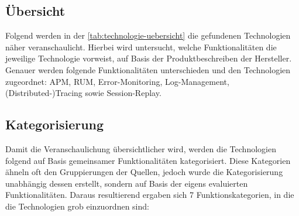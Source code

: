 \subsection{Übersicht}

Folgend werden in der \autoref{tab:technologie-uebersicht} die gefundenen Technologien näher veranschaulicht. Hierbei wird untersucht, welche Funktionalitäten die jeweilige Technologie vorweist, auf Basis der Produktbeschreiben der Hersteller. Genauer werden folgende Funktionalitäten unterschieden und den Technologien zugeordnet: APM, RUM, Error-Monitoring, Log-Management, (Distributed-)Tracing sowie Session-Replay.



\subsection{Kategorisierung}

Damit die Veranschaulichung übersichtlicher wird, werden die Technologien folgend auf Basis gemeinsamer Funktionalitäten kategorisiert. Diese Kategorien ähneln oft den Gruppierungen der Quellen, jedoch wurde die Kategorisierung unabhängig dessen erstellt, sondern auf Basis der eigens evaluierten Funktionalitäten. Daraus resultierend ergaben sich 7 Funktionskategorien, in die die Technologien grob einzuordnen sind:

